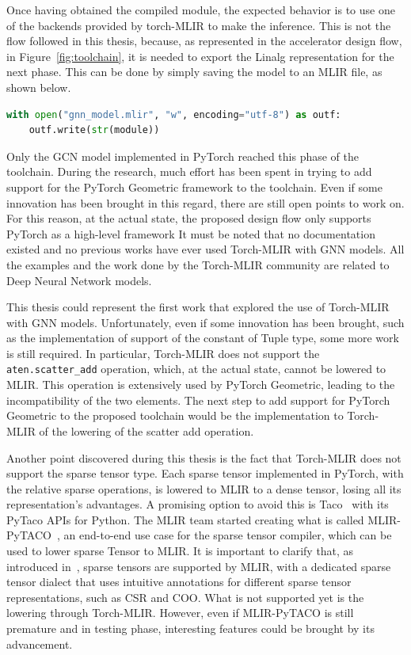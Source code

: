 Once having obtained the compiled module, the expected behavior is to use one of the backends provided by torch-MLIR to make the inference.
This is not the flow followed in this thesis, because, as represented in the accelerator design flow, in Figure~\ref{fig:toolchain}, it is needed to export the Linalg representation for the next phase.
This can be done by simply saving the model to an MLIR file, as shown below.
\begin{lstlisting}[language=Python,label={lst:torch_mlir-export}]
with open("gnn_model.mlir", "w", encoding="utf-8") as outf:
    outf.write(str(module))
\end{lstlisting}

Only the GCN model implemented in PyTorch reached this phase of the toolchain.
During the research, much effort has been spent in trying to add support for the PyTorch Geometric framework to the toolchain.
Even if some innovation has been brought in this regard, there are still open points to work on.
For this reason, at the actual state, the proposed design flow only supports PyTorch as a high-level framework
It must be noted that no documentation existed and no previous works have ever used Torch-MLIR with GNN models.
All the examples and the work done by the Torch-MLIR community are related to Deep Neural Network models.

This thesis could represent the first work that explored the use of Torch-MLIR with GNN models.
Unfortunately, even if some innovation has been brought, such as the implementation of support of the constant of Tuple type, some more work is still required.
In particular, Torch-MLIR does not support the \lstinline{aten.scatter_add} operation, which, at the actual state, cannot be lowered to MLIR\@.
This operation is extensively used by PyTorch Geometric, leading to the incompatibility of the two elements.
The next step to add support for PyTorch Geometric to the proposed toolchain would be the implementation to Torch-MLIR of the lowering of the scatter add operation.

Another point discovered during this thesis is the fact that Torch-MLIR does not support the sparse tensor type. 
Each sparse tensor implemented in PyTorch, with the relative sparse operations, is lowered to MLIR to a dense tensor, losing all its representation's advantages.
A promising option to avoid this is Taco~\cite{taco} with its PyTaco APIs for Python.
The MLIR team started creating what is called MLIR-PyTACO~\cite{mlir-pytaco}, an end-to-end use case for the sparse tensor compiler, which can be used to lower sparse Tensor to MLIR\@.
It is important to clarify that, as introduced in~\cite{Bik_2022}, sparse tensors are supported by MLIR, with a dedicated sparse tensor dialect that uses intuitive annotations for different sparse tensor representations, such as CSR and COO.
What is not supported yet is the lowering through Torch-MLIR\@.
However, even if MLIR-PyTACO is still premature and in testing phase, interesting features could be brought by its advancement.

